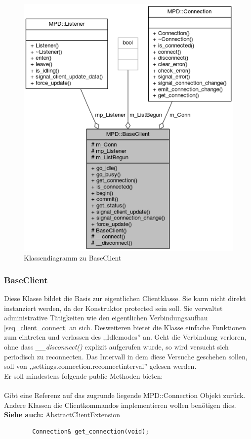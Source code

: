 \begin{figure}[htb!]
	\centering
        \includegraphics[scale=0.55]{BaseClientCollab.png}
	\caption{Klassendiagramm zu BaseClient}
	\label{collab_base_client}
\end{figure}

\subsubsection{BaseClient}
Diese Klasse bildet die Basis zur eigentlichen Clientklasse. Sie kann nicht direkt instanziert werden, da
der Konstruktor protected sein soll.
Sie verwaltet administrative Tätigkeiten wie den eigentlichen Verbindungsaufbau \ref{seq_client_connect} an sich. 
Desweiteren bietet die Klasse einfache Funktionen zum eintreten und verlassen des ,,Idlemodes'' an.
Geht die Verbindung verloren, ohne dass \emph{\_\_disconnect()} explizit aufgerufen wurde, so wird versucht sich periodisch zu reconnecten.
Das Intervall in dem diese Versuche geschehen sollen, soll von ,,settings.connection.reconnectinterval'' gelesen werden.
\\
Er soll mindestens folgende public Methoden bieten:
\\
\\
Gibt eine Referenz auf das zugrunde liegende MPD::Connection Objekt zurück. 
Andere Klassen die Clientkommandos implementieren wollen benötigen dies.
\\
\textbf{Siehe auch:} AbstractClientExtension
\begin{verbatim}
        Connection& get_connection(void);
\end{verbatim}


